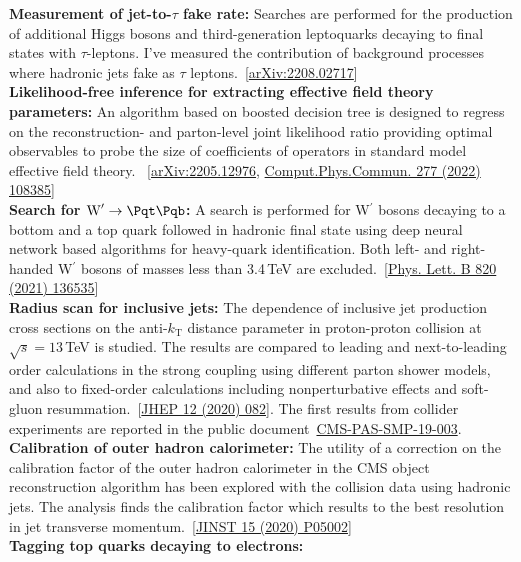 \documentclass[a4paper,11pt]{article}
\newcommand{\Pb}{{{\Pqb}}\xspace}
\newcommand{\Pt}{{{\Pqt}}\xspace}
\begin{document}
{\textbf{Measurement of jet-to-$\tau$ fake rate:}
Searches are performed for the production of additional Higgs bosons and third-generation leptoquarks decaying to final states with $\tau$-leptons.
I've measured the contribution of background processes where hadronic jets fake as $\tau$ leptons.~[\href{https://arxiv.org/abs/2208.02717}{arXiv:2208.02717}]\\
\textbf{Likelihood-free inference for extracting effective field theory parameters:}
An algorithm based on boosted decision tree is designed to regress on the reconstruction- and parton-level joint likelihood ratio providing optimal observables to probe the size of coefficients of operators in standard model effective field theory.
~[\href{https://arxiv.org/abs/2205.12976}{arXiv:2205.12976}, \href{https://doi.org/10.1016/j.cpc.2022.108385}{Comput.Phys.Commun. 277 (2022) 108385}]\\
\textbf{Search for $\textrm{W}^\prime \rightarrow \Pt \Pb$:}
A search is performed for W$^\prime$ bosons decaying to a bottom and a top quark followed in hadronic final state using deep neural network based algorithms for heavy-quark identification.
Both left- and right-handed W$^\prime$ bosons of masses less than 3.4\,TeV are excluded.~[\href{https://doi.org/10.1016/j.physletb.2021.136535}{Phys. Lett. B 820 (2021) 136535}]\\
\textbf{Radius scan for inclusive jets:}
The dependence of inclusive jet production cross sections on the anti-$k_{\mathrm{T}}$ distance parameter in proton-proton collision at $\sqrt{s}=13$\,TeV is studied. The results are compared to leading and next-to-leading order calculations in the strong coupling using different parton shower models, and also to fixed-order calculations including nonperturbative effects and soft-gluon resummation.~[\href{https://doi.org/10.1007/JHEP12(2020)082}{JHEP 12 (2020) 082}]. The first results from collider experiments are reported in the public document~\href{http://cds.cern.ch/record/2682598?ln=en}{CMS-PAS-SMP-19-003}.\\
\textbf{Calibration of outer hadron calorimeter:}
The utility of a correction on the calibration factor of the outer hadron calorimeter in the CMS object reconstruction algorithm  has been explored with the collision data using hadronic jets. The analysis finds the calibration factor which results to the best resolution in jet transverse momentum.~[\href{https://doi.org/10.1088/1748-0221/15/05/P05002}{JINST 15 (2020) P05002}]\\
\textbf{Tagging top quarks decaying to electrons:}
}
\end{document}
